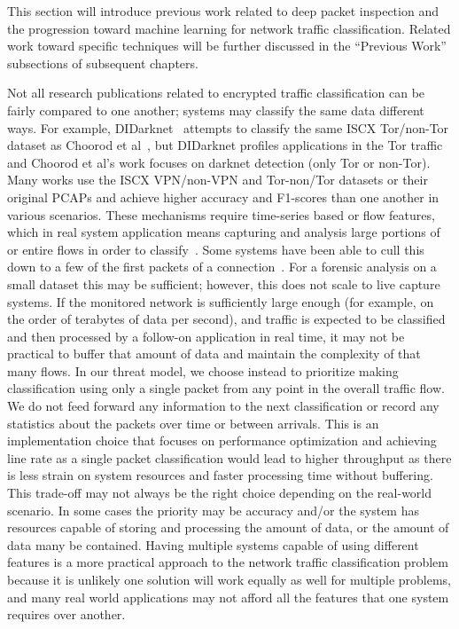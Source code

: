 This section will introduce previous work related to deep packet inspection and the progression toward  machine learning for network traffic classification. Related work toward specific techniques will be further discussed in the ``Previous Work'' subsections of subsequent chapters.

Not all research publications related to encrypted traffic classification can be fairly compared to one another; systems may classify the same data different ways. For example, DIDarknet~\cite{didarknet} attempts to classify the same ISCX Tor/non-Tor dataset as Choorod et al~\cite{choorod2022tor}, but DIDarknet profiles applications in the Tor traffic and Choorod et al's work focuses on darknet detection (only Tor or non-Tor). Many works use the ISCX VPN/non-VPN and Tor-non/Tor datasets or their original PCAPs and achieve higher accuracy and F1-scores than one another in various scenarios. These mechanisms require time-series based or flow features, which in real system application means capturing and analysis large portions of or entire flows in order to classify~\cite{perera2017comparison, deeppacket, panchenko2011website, amaral2016machine, cao2014survey, ibrahim2016internet, fan2017investigation, sun2018internet, iscx-tor-paper, iscx-vpn-paper}. Some systems have been able to cull this down to a few of the first packets of a connection~\cite{onlyheader, zhou2018encrypted}. For a forensic analysis on a small dataset this may be sufficient; however, this does not scale to live capture systems. If the monitored network is sufficiently large enough (for example, on the order of terabytes of data per second), and traffic is expected to be classified and then processed by a follow-on application in real time, it may not be practical to buffer that amount of data and maintain the complexity of that many flows. In our threat model, we choose instead to prioritize making classification using only a single packet from any point in the overall traffic flow. We do not feed forward any information to the next classification or record any statistics about the packets over time or between arrivals. This is an implementation choice that focuses on performance optimization and achieving line rate as a single packet classification would lead to higher throughput as there is less strain on system resources and faster processing time without buffering. This trade-off may not always be the right choice depending on the real-world scenario. In some cases the priority may be accuracy and/or the system has resources capable of storing and processing the amount of data, or the amount of data many be contained. Having multiple systems capable of using different features is a more practical approach to the network traffic classification problem because it is unlikely one solution will work equally as well for multiple problems, and many real world applications may not afford all the features that one system requires over another.

